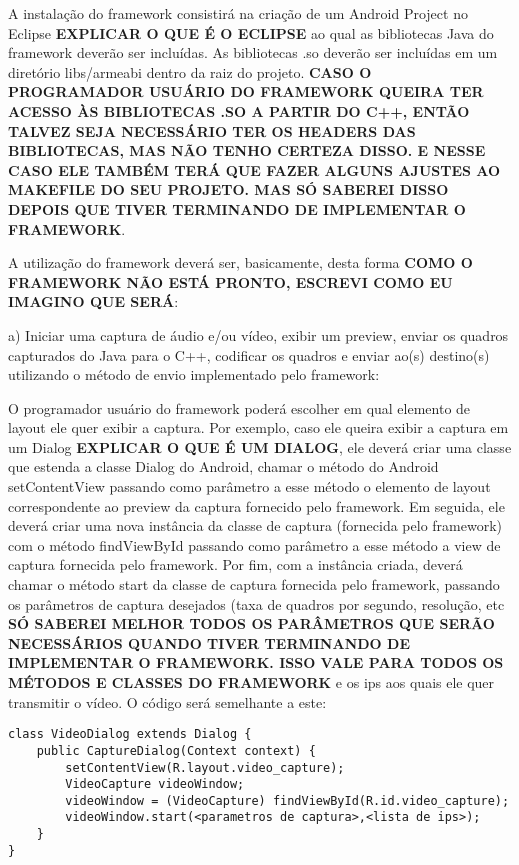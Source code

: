 \documentclass{acm_proc_article-sp}
\newcommand{\todo}[1]{\textcolor[rgb]{1.00,0.00,0.00}{\bf \uppercase{#1}}}
\begin{document}
A instalação do framework consistirá na criação de um Android Project no Eclipse \todo{explicar o que é o eclipse} ao qual as bibliotecas Java do framework deverão ser incluídas. As bibliotecas .so deverão ser incluídas em um diretório libs/armeabi dentro da raiz do projeto. \todo{caso o programador usuário do framework queira ter acesso às bibliotecas .so a partir do C++, então talvez seja necessário ter os headers das bibliotecas, mas não tenho certeza disso. E nesse caso ele também terá que fazer alguns ajustes ao makefile do seu projeto. Mas só saberei disso depois que tiver terminando de implementar o framework}.

A utilização do framework deverá ser, basicamente, desta forma \todo{como o framework não está pronto, escrevi como eu imagino que será}:

a) Iniciar uma captura de áudio e/ou vídeo, exibir um preview, enviar os quadros capturados do Java para o C++, codificar os quadros e enviar ao(s) destino(s) utilizando o método de envio implementado pelo framework:

O programador usuário do framework poderá escolher em qual elemento de layout ele quer exibir a captura. Por exemplo, caso ele queira exibir a captura em um Dialog \todo{explicar o que é um Dialog}, ele deverá criar uma classe que estenda a classe Dialog do Android, chamar o método do Android setContentView passando como parâmetro a esse método o elemento de layout correspondente ao preview da captura fornecido pelo framework. Em seguida, ele deverá criar uma nova instância da classe de captura (fornecida pelo framework) com o método findViewById passando como parâmetro a esse método a view de captura fornecida pelo framework. Por fim, com a instância criada, deverá chamar o método start da classe de captura fornecida pelo framework, passando os parâmetros de captura desejados (taxa de quadros por segundo, resolução, etc \todo{só saberei melhor todos os parâmetros que serão necessários quando tiver terminando de implementar o framework. Isso vale para todos os métodos e classes do framework} e os ips aos quais ele quer transmitir o vídeo. O código será semelhante a este:

\begin{lstlisting}
class VideoDialog extends Dialog {
    public CaptureDialog(Context context) {
        setContentView(R.layout.video_capture);
        VideoCapture videoWindow;
        videoWindow = (VideoCapture) findViewById(R.id.video_capture);
        videoWindow.start(<parametros de captura>,<lista de ips>);
    }
}
\end{lstlisting}
\end{document}
